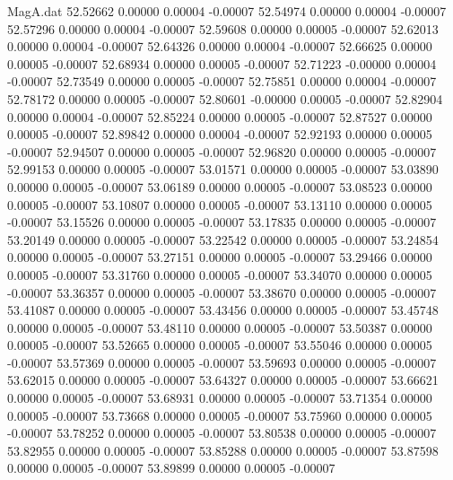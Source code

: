 \begin{filecontents}{MagA.dat}
  52.52662    0.00000    0.00004   -0.00007
  52.54974    0.00000    0.00004   -0.00007
  52.57296    0.00000    0.00004   -0.00007
  52.59608    0.00000    0.00005   -0.00007
  52.62013    0.00000    0.00004   -0.00007
  52.64326    0.00000    0.00004   -0.00007
  52.66625    0.00000    0.00005   -0.00007
  52.68934    0.00000    0.00005   -0.00007
  52.71223   -0.00000    0.00004   -0.00007
  52.73549    0.00000    0.00005   -0.00007
  52.75851    0.00000    0.00004   -0.00007
  52.78172    0.00000    0.00005   -0.00007
  52.80601   -0.00000    0.00005   -0.00007
  52.82904    0.00000    0.00004   -0.00007
  52.85224    0.00000    0.00005   -0.00007
  52.87527    0.00000    0.00005   -0.00007
  52.89842    0.00000    0.00004   -0.00007
  52.92193    0.00000    0.00005   -0.00007
  52.94507    0.00000    0.00005   -0.00007
  52.96820    0.00000    0.00005   -0.00007
  52.99153    0.00000    0.00005   -0.00007
  53.01571    0.00000    0.00005   -0.00007
  53.03890    0.00000    0.00005   -0.00007
  53.06189    0.00000    0.00005   -0.00007
  53.08523    0.00000    0.00005   -0.00007
  53.10807    0.00000    0.00005   -0.00007
  53.13110    0.00000    0.00005   -0.00007
  53.15526    0.00000    0.00005   -0.00007
  53.17835    0.00000    0.00005   -0.00007
  53.20149    0.00000    0.00005   -0.00007
  53.22542    0.00000    0.00005   -0.00007
  53.24854    0.00000    0.00005   -0.00007
  53.27151    0.00000    0.00005   -0.00007
  53.29466    0.00000    0.00005   -0.00007
  53.31760    0.00000    0.00005   -0.00007
  53.34070    0.00000    0.00005   -0.00007
  53.36357    0.00000    0.00005   -0.00007
  53.38670    0.00000    0.00005   -0.00007
  53.41087    0.00000    0.00005   -0.00007
  53.43456    0.00000    0.00005   -0.00007
  53.45748    0.00000    0.00005   -0.00007
  53.48110    0.00000    0.00005   -0.00007
  53.50387    0.00000    0.00005   -0.00007
  53.52665    0.00000    0.00005   -0.00007
  53.55046    0.00000    0.00005   -0.00007
  53.57369    0.00000    0.00005   -0.00007
  53.59693    0.00000    0.00005   -0.00007
  53.62015    0.00000    0.00005   -0.00007
  53.64327    0.00000    0.00005   -0.00007
  53.66621    0.00000    0.00005   -0.00007
  53.68931    0.00000    0.00005   -0.00007
  53.71354    0.00000    0.00005   -0.00007
  53.73668    0.00000    0.00005   -0.00007
  53.75960    0.00000    0.00005   -0.00007
  53.78252    0.00000    0.00005   -0.00007
  53.80538    0.00000    0.00005   -0.00007
  53.82955    0.00000    0.00005   -0.00007
  53.85288    0.00000    0.00005   -0.00007
  53.87598    0.00000    0.00005   -0.00007
  53.89899    0.00000    0.00005   -0.00007

\end{filecontents}
